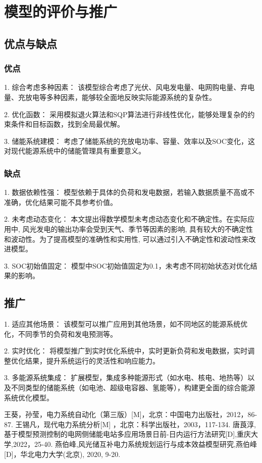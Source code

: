 \documentclass{cumcmthesis}
\begin{document}
 
\section{模型的评价与推广}
\subsection{优点与缺点}
\subsubsection{优点}
1. 综合考虑多种因素：
    该模型综合考虑了光伏、风电发电量、电网购电量、弃电量、充放电等多种因素，能够较全面地反映实际能源系统的复杂性。

2. 优化函数：
    采用模拟退火算法和SQP算法进行非线性优化，能够处理复杂的约束条件和目标函数，找到全局最优解。

3. 储能系统建模：
    考虑了储能系统的充放电功率、容量、效率以及SOC变化，这对现代能源系统中的储能管理具有重要意义。


\subsubsection{缺点}
1. 数据依赖性强：
    模型依赖于具体的负荷和发电数据，若输入数据质量不高或不准确，优化结果可能不具参考价值。

2. 未考虑动态变化：
    本文提出得数学模型未考虑动态变化和不确定性。在实际应用中, 风光发电的输出功率会受到天气、季节等因素的影响, 具有较大的不确定性和波动性。为了提高模型的准确性和实用性, 可以通过引入不确定性和波动性来改进模型。

3. SOC初始值固定：
    模型中SOC初始值固定为0.1，未考虑不同初始状态对优化结果的影响。

\subsection{推广}
1. 适应其他场景：
    该模型可以推广应用到其他场景，如不同地区的能源系统优化，不同季节的负荷和发电预测等。

2. 实时优化：
    将模型推广到实时优化系统中，实时更新负荷和发电数据，实时调整优化结果，提升系统运行的灵活性和响应能力。

3. 多能源系统集成：
    扩展模型，集成多种能源形式（如水电、核电、地热等）以及不同类型的储能系统（如电池、超级电容器、氢能等），构建更全面的综合能源系统优化模型。

\newpage



	 
\begin{thebibliography}{99}
	
	王葵，孙莹，电力系统自动化（第三版）[M]，北京：中国电力出版社，2012，86-87.
	王锡凡，现代电力系统分析[M] ，北京：科学出版社，2003，117-134.
	唐莨淳, 基于模型预测控制的电网侧储能电站多应用场景日前-日内运行方法研究[D],重庆大学,2022，25-40.
	燕伯峰,风光储互补电力系统规划运行与成本效益模型研究,燕伯峰[D]，华北电力大学(北京), 2020, 9-20.
	
	
\end{thebibliography}	
\end{document}
